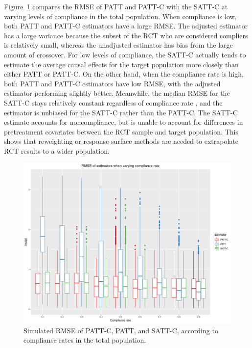 \documentclass[hidelinks,12pt]{article}
\begin{document}
{Figure~\ref{fig:rmse_boxplots_rateC} compares the RMSE of PATT and PATT-C with the SATT-C  at varying levels of compliance in the total population. When compliance is low, both PATT and PATT-C estimators have a large RMSE. The adjusted estimator has a large variance because the subset of the RCT who are considered compliers is relatively small, whereas the unadjusted estimator has bias from the large amount of crossover. For low levels of compliance, the SATT-C actually tends to estimate the average causal effects for the target population more closely than either PATT or PATT-C. On the other hand, when the compliance rate is high, both PATT and PATT-C estimators have low RMSE, with {\color{red} the} adjusted estimator performing slightly better. Meanwhile, the median RMSE for the SATT-C stays relatively constant regardless of compliance rate {\color{red}, and} the estimator is unbiased for the SATT-C rather than the PATT-C. The SATT-C estimate accounts for noncompliance, but is unable to account for differences in pretreatment covariates between the RCT sample and target population. This shows that {\color{red}reweighting or response surface methods} are needed to extrapolate RCT results to a wider population.

%

\begin{figure}[htbp]
\begin{center}
\includegraphics[width = 1\textwidth]{rmse_boxplots_rateC}
\caption{Simulated RMSE of PATT-C, PATT, and SATT-C, according to compliance rates in the total population.\label{fig:rmse_boxplots_rateC}}
\end{center}
\end{figure}

}
\end{document}
